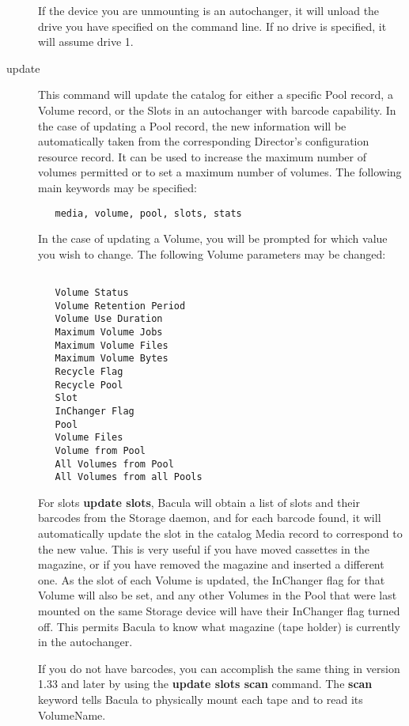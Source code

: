 \begin{description}
   If the device you are unmounting is an autochanger, it will unload
   the drive you have specified on the command line. If no drive is
   specified, it will assume drive 1.

\label{UpdateCommand}
\item [update]
   This command will update the catalog for either a specific Pool record, a Volume
   record, or the Slots in an  autochanger with barcode capability. In the case
   of updating a  Pool record, the new information will be automatically taken
   from  the corresponding Director's configuration resource record. It  can be
   used to increase the maximum number of volumes permitted or  to set a maximum
   number of volumes. The following main  keywords may be specified:
\footnotesize
\begin{verbatim}
   media, volume, pool, slots, stats
\end{verbatim}
\normalsize

In the case of updating a  Volume, you will be prompted for which value you
wish to change.  The following Volume parameters may be changed:

\footnotesize
\begin{verbatim}

   Volume Status
   Volume Retention Period
   Volume Use Duration
   Maximum Volume Jobs
   Maximum Volume Files
   Maximum Volume Bytes
   Recycle Flag
   Recycle Pool
   Slot
   InChanger Flag
   Pool
   Volume Files
   Volume from Pool
   All Volumes from Pool
   All Volumes from all Pools

\end{verbatim}
\normalsize

   For slots {\bf update slots}, Bacula will obtain a list of slots and
   their barcodes from the Storage daemon, and for each barcode found, it
   will automatically update the slot in the catalog Media record to
   correspond to the new value.  This is very useful if you have moved
   cassettes in the magazine, or if you have removed the magazine and
   inserted a different one.  As the slot of each Volume is updated, the
   InChanger flag for that Volume will also be set, and any other Volumes
   in the Pool that were last mounted on the same Storage device
   will have their InChanger flag turned off.  This permits
   Bacula to know what magazine (tape holder) is currently in the
   autochanger.

   If you do not have barcodes, you can accomplish the same thing in
   version 1.33 and later by using the {\bf update slots scan} command.
   The {\bf scan} keyword tells Bacula to physically mount each tape and to
   read its VolumeName.


\end{description}
